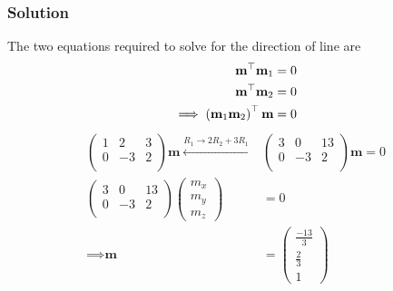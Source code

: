 \documentclass{beamer}
\begin{document}
\begin{frame}
\frametitle{Solution}
The two equations required to solve for the direction of line are 
\begin{align}
\textbf{m}^\top\textbf{m}_1 &= 0\\
\textbf{m}^\top\textbf{m}_2 &= 0\\
\implies \left(\textbf{m}_1\textbf{m}_2\right)^{\top}\textbf{m} &= 0
\end{align}
\begin{align}
    \begin{pmatrix}
        1 & 2 & 3\\
        0 & -3 & 2   \\
    \end{pmatrix}\textbf{m} \xleftarrow{R_1 \to 2R_2 + 3R_1} &\begin{pmatrix}
        3 & 0 & 13\\
        0 & -3 & 2   \\
    \end{pmatrix}\textbf{m} = 0\\
    \begin{pmatrix}
        3 & 0 & 13\\
        0 & -3 & 2   \\
    \end{pmatrix}\begin{pmatrix}
        m_x\\
        m_y\\
        m_z
    \end{pmatrix} &= 0\\
    \implies \textbf{m} &= \begin{pmatrix}
        \frac{-13}{3}\\
        \frac{2}{3}\\
        1
    \end{pmatrix}
\end{align}
\end{frame}
\end{document}
